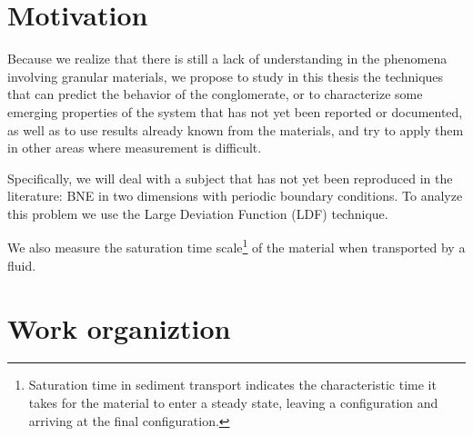 \section{Motivation}
\label{sec:motivacao}

    
    Because we realize that there is still a lack of understanding in the phenomena involving granular materials, we propose to study in this thesis the techniques that can predict the behavior of the conglomerate, or to characterize some emerging properties of the system that has not yet been reported or documented, as well as to use results already known from the materials, and try to apply them in other areas where measurement is difficult.


    Specifically, we will deal with a subject that has not yet been reproduced in the literature: BNE in two dimensions with periodic boundary conditions. To analyze this problem we use the Large Deviation Function (LDF) \cite{Large_Deviation_in_Physics} technique.


    We also measure the saturation time scale\footnote{Saturation time in sediment transport indicates the characteristic time it takes for the material to enter a steady state, leaving a configuration and arriving at the final configuration.} of the material when transported by a fluid.

\section{Work organiztion}
\label{sec:organizacaoTrabalho}


